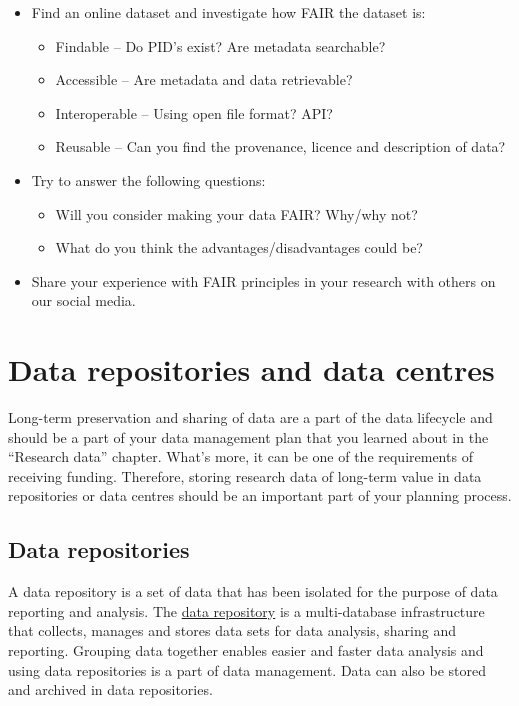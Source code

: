 \documentclass[
]{book}
\begin{document}
\begin{itemize}
\item
  Find an online dataset and investigate how FAIR the dataset is:

  \begin{itemize}
  \item
    Findable -- Do PID's exist? Are metadata searchable?
  \item
    Accessible -- Are metadata and data retrievable?
  \item
    Interoperable -- Using open file format? API?
  \item
    Reusable -- Can you find the provenance, licence and description of data?
  \end{itemize}
\item
  Try to answer the following questions:

  \begin{itemize}
  \item
    Will you consider making your data FAIR? Why/why not?
  \item
    What do you think the advantages/disadvantages could be?
  \end{itemize}
\item
  Share your experience with FAIR principles in your research with others on our social media.
\end{itemize}

\hypertarget{data-repositories-and-data-centres}{%
\chapter{Data repositories and data centres}\label{data-repositories-and-data-centres}}

Long-term preservation and sharing of data are a part of the data lifecycle and should be a part of your data management plan that you learned about in the ``Research data'' chapter. What's more, it can be one of the requirements of receiving funding. Therefore, storing research data of long-term value in data repositories or data centres should be an important part of your planning process.

\hypertarget{data-repositories}{%
\section{Data repositories}\label{data-repositories}}

A data repository is a set of data that has been isolated for the purpose of data reporting and analysis. The \href{http://digitalguardian.com/blog/what-data-repository}{data repository} is a multi-database infrastructure that collects, manages and stores data sets for data analysis, sharing and reporting. Grouping data together enables easier and faster data analysis and using data repositories is a part of data management. Data can also be stored and archived in data repositories.
\end{document}
